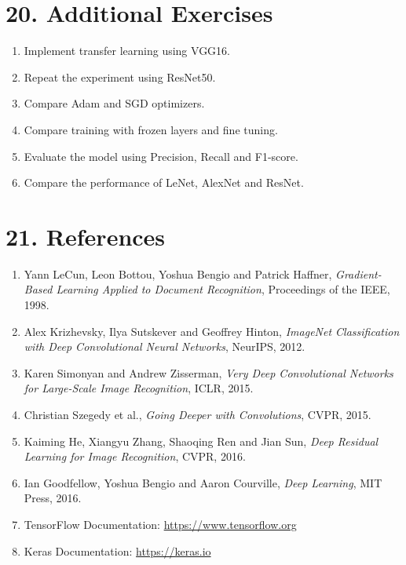\documentclass[11pt]{article}
\begin{document}

\section*{20. Additional Exercises}

\begin{enumerate}

\item Implement transfer learning using VGG16.

\item Repeat the experiment using ResNet50.

\item Compare Adam and SGD optimizers.

\item Compare training with frozen layers and fine tuning.

\item Evaluate the model using Precision, Recall and F1-score.

\item Compare the performance of LeNet, AlexNet and ResNet.

\end{enumerate}


\section*{21. References}

\begin{enumerate}

\item Yann LeCun, Leon Bottou, Yoshua Bengio and Patrick Haffner,
\emph{Gradient-Based Learning Applied to Document Recognition},
Proceedings of the IEEE, 1998.

\item Alex Krizhevsky, Ilya Sutskever and Geoffrey Hinton,
\emph{ImageNet Classification with Deep Convolutional Neural Networks},
NeurIPS, 2012.

\item Karen Simonyan and Andrew Zisserman,
\emph{Very Deep Convolutional Networks for Large-Scale Image Recognition},
ICLR, 2015.

\item Christian Szegedy et al.,
\emph{Going Deeper with Convolutions},
CVPR, 2015.

\item Kaiming He, Xiangyu Zhang, Shaoqing Ren and Jian Sun,
\emph{Deep Residual Learning for Image Recognition},
CVPR, 2016.

\item Ian Goodfellow, Yoshua Bengio and Aaron Courville,
\emph{Deep Learning},
MIT Press, 2016.

\item TensorFlow Documentation:
\url{https://www.tensorflow.org}

\item Keras Documentation:
\url{https://keras.io}

\end{enumerate}

\end{document}
